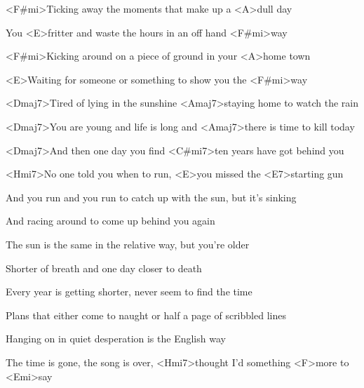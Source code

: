 

\zs
<F#mi>Ticking away the moments that make up a <A>dull day

You <E>fritter and waste the hours in an off hand <F#mi>way

<F#mi>Kicking around on a piece of ground in your <A>home town

<E>Waiting for someone or something to show you the <F#mi>way
\ks

\zs
<Dmaj7>Tired of lying in the sunshine <Amaj7>staying home to watch the rain

<Dmaj7>You are young and life is long and <Amaj7>there is time to kill today

<Dmaj7>And then one day you find <C#mi7>ten years have got behind you

<Hmi7>No one told you when to run, <E>you missed the <E7>starting gun
\ks

\zs
And you run and you run to catch up with the sun, but it's sinking

And racing around to come up behind you again

The sun is the same in the relative way, but you're older

Shorter of breath and one day closer to death
\ks

\zs
Every year is getting shorter, never seem to find the time

Plans that either come to naught or half a page of scribbled lines

Hanging on in quiet desperation is the English way

The time is gone, the song is over, <Hmi7>thought I'd something <F>more to <Emi>say
\ks

\kp





